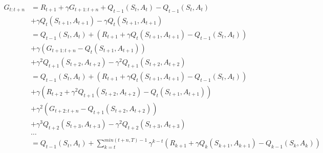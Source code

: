 \documentclass[12pt,a4paper]{article}
\begin{document}
\begin{enumerate}
    \begin{align*}
    G_{t: t + n} &= R_{t + 1} + \gamma G_{t + 1: t + n}
    + Q_{t - 1}(S_t, A_t) - Q_{t - 1}(S_t, A_t)\\
    &+ \gamma Q_t(S_{t + 1}, A_{t + 1}) - \gamma Q_t(S_{t + 1}, A_{t + 1})\\
    &=Q_{t - 1}(S_t, A_t) + (R_{t + 1} + \gamma Q_t(S_{t + 1}, A_{t + 1})
    - Q_{t - 1}(S_t, A_t))\\
    &+ \gamma(G_{t + 1: t + n} - Q_t(S_{t + 1}, A_{t + 1}))\\
    &+ \gamma^2 Q_{t + 1}(S_{t + 2}, A_{t + 2}) - \gamma^2 Q_{t + 1}(S_{t + 2}, A_{t + 2})\\
    &= Q_{t - 1}(S_t, A_t)
    + (R_{t + 1} + \gamma Q_t(S_{t + 1}, A_{t + 1}) - Q_{t - 1}(S_t, A_t))\\
    &+ \gamma(R_{t + 2} + \gamma^2 Q_{t + 1}(S_{t + 2}, A_{t + 2}) - Q_t(S_{t + 1}, A_{t + 1}))\\
    &+ \gamma^2(G_{t + 2: t + n} - Q_{t + 1}(S_{t + 2}, A_{t + 2}))\\
    &+ \gamma^3 Q_{t + 2}(S_{t + 3}, A_{t + 3}) - \gamma^2 Q_{t + 2}(S_{t + 3}, A_{t + 3})\\
    &\dots\\
    &= Q_{t - 1}(S_t, A_t) + \sum\limits_{k = t}^{min(t + n, T) - 1}
    \gamma^{k - t}(R_{k + 1} + \gamma Q_k(S_{k + 1}, A_{k + 1}) - Q_{k - 1}(S_k, A_k))
    \end{align*}

\end{enumerate}
\end{document}
